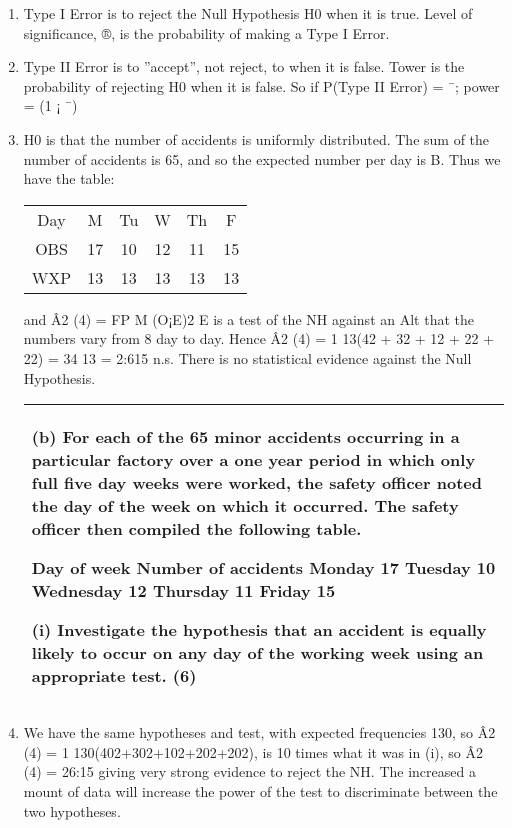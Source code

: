 \documentclass[a4paper,12pt]{article}
\begin{document}
\begin{enumerate}
    \item  Type I Error is to reject the Null Hypothesis H0 when it is true. Level of significance,
®, is the probability of making a Type I Error.
\item Type II Error is to ”accept”, not reject, to when it is false. Tower is the probability
of rejecting H0 when it is false. So if P(Type II Error) = ¯; power = (1 ¡ ¯)
\item  H0 is that the number of accidents is uniformly distributed. The sum of the number
of accidents is 65, and so the expected number per day is B. Thus we have the table:
\begin{center}
\begin{tabular}{|c|c|c|c|c|c|}
Day & M & Tu&  W & Th&  F\\
OBS & 17 & 10 & 12 & 11 & 15\\
WXP & 13&  13&  13&  13&  13 \\
\end{tabular}
\end{center}
and Â2
(4) =
FP
M
(O¡E)2
E is a test of the NH against an Alt that the numbers vary from
8
day to day. Hence Â2
(4) = 1
13(42 + 32 + 12 + 22 + 22) = 34
13 = 2:615 n.s. There is no
statistical evidence against the Null Hypothesis.

  \begin{table}[ht!]
     \centering
     \begin{tabular}{|p{15cm}|}
     \hline  
 (b) For each of the 65 minor accidents occurring in a particular factory over a one year period in which only full five day weeks were worked, the safety officer noted the day of the week on which it occurred.  The safety officer then compiled the following table. 
 
Day of week Number of accidents Monday 17 Tuesday 10 Wednesday 12 Thursday 11 Friday 15 
 
 
 (i) Investigate the hypothesis that an accident is equally likely to occur on any day of the working week using an appropriate test. (6) 
 
   
 \\ \hline 
      \end{tabular}
    \end{table}    
\item  We have the same hypotheses and test, with expected frequencies 130, so Â2
(4) =
1
130(402+302+102+202+202), is 10 times what it was in (i), so Â2
(4) = 26:15 giving
very strong evidence to reject the NH. The increased a mount of data will increase
the power of the test to discriminate between the two hypotheses.
\end{enumerate}
\end{document}
